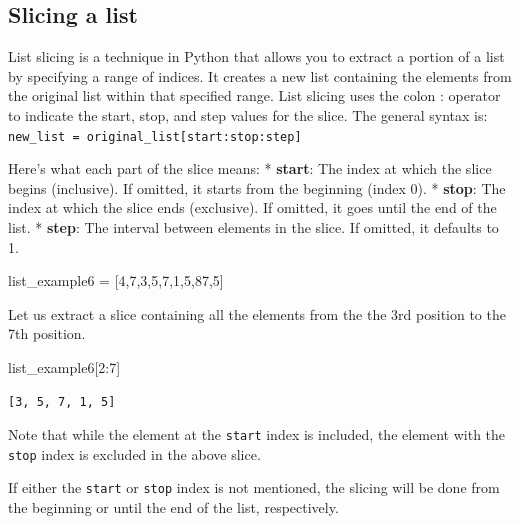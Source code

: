 \documentclass[
  letterpaper,
  DIV=11,
  numbers=noendperiod]{scrreprt}
\newenvironment{Shaded}{\begin{snugshade}}{\end{snugshade}}
\newcommand{\DecValTok}[1]{\textcolor[rgb]{0.68,0.00,0.00}{#1}}
\newcommand{\NormalTok}[1]{\textcolor[rgb]{0.00,0.23,0.31}{#1}}
\newcommand{\OperatorTok}[1]{\textcolor[rgb]{0.37,0.37,0.37}{#1}}
\begin{document}
\hypertarget{slicing-a-list}{%
\subsection{Slicing a list}\label{slicing-a-list}}

List slicing is a technique in Python that allows you to extract a
portion of a list by specifying a range of indices. It creates a new
list containing the elements from the original list within that
specified range. List slicing uses the colon : operator to indicate the
start, stop, and step values for the slice. The general syntax is:
\texttt{new\_list\ =\ original\_list{[}start:stop:step{]}}

Here's what each part of the slice means: * \textbf{start}: The index at
which the slice begins (inclusive). If omitted, it starts from the
beginning (index 0). * \textbf{stop}: The index at which the slice ends
(exclusive). If omitted, it goes until the end of the list. *
\textbf{step}: The interval between elements in the slice. If omitted,
it defaults to 1.

\begin{Shaded}
\begin{Highlighting}[]
\NormalTok{list\_example6 }\OperatorTok{=}\NormalTok{ [}\DecValTok{4}\NormalTok{,}\DecValTok{7}\NormalTok{,}\DecValTok{3}\NormalTok{,}\DecValTok{5}\NormalTok{,}\DecValTok{7}\NormalTok{,}\DecValTok{1}\NormalTok{,}\DecValTok{5}\NormalTok{,}\DecValTok{87}\NormalTok{,}\DecValTok{5}\NormalTok{]}
\end{Highlighting}
\end{Shaded}

Let us extract a slice containing all the elements from the the 3rd
position to the 7th position.

\begin{Shaded}
\begin{Highlighting}[]
\NormalTok{list\_example6[}\DecValTok{2}\NormalTok{:}\DecValTok{7}\NormalTok{]}
\end{Highlighting}
\end{Shaded}

\begin{verbatim}
[3, 5, 7, 1, 5]
\end{verbatim}

Note that while the element at the \texttt{start} index is included, the
element with the \texttt{stop} index is excluded in the above slice.

If either the \texttt{start} or \texttt{stop} index is not mentioned,
the slicing will be done from the beginning or until the end of the
list, respectively.
\end{document}
